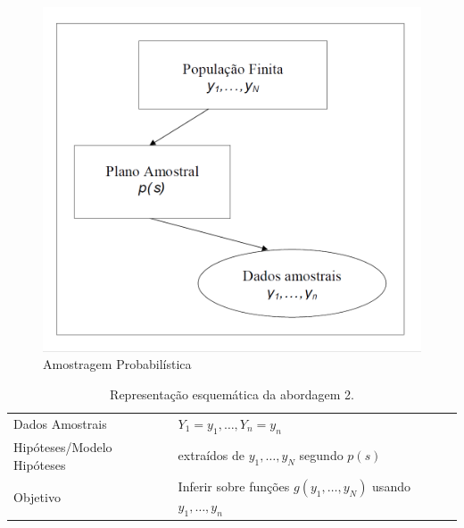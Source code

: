 \documentclass[]{book}
\theoremstyle{definition}
\theoremstyle{definition}
\theoremstyle{definition}
\theoremstyle{remark}
\begin{document}
\begin{figure}
\centering
\includegraphics{Figuras/fig22.png}
\caption{\label{fig:modamo}Amostragem Probabilística}
\end{figure}

\begin{longtable}[]{@{}ll@{}}
\caption{\label{tab:modelamo} Representação esquemática da abordagem
2.}\tabularnewline
\toprule
\begin{minipage}[t]{0.29\columnwidth}\raggedright\strut
Dados Amostrais\strut
\end{minipage} & \begin{minipage}[t]{0.60\columnwidth}\raggedright\strut
\(Y_1=y_1,\ldots, Y_n=y_n\)\strut
\end{minipage}\tabularnewline
\begin{minipage}[t]{0.29\columnwidth}\raggedright\strut
Hipóteses/Modelo Hipóteses\strut
\end{minipage} & \begin{minipage}[t]{0.60\columnwidth}\raggedright\strut
extraídos de \(y_1,\ldots,y_N\) segundo \(p(s)\)\strut
\end{minipage}\tabularnewline
\begin{minipage}[t]{0.29\columnwidth}\raggedright\strut
Objetivo\strut
\end{minipage} & \begin{minipage}[t]{0.60\columnwidth}\raggedright\strut
Inferir sobre funções \(g(y_1, \ldots, y_N)\) usando
\(y_1, \ldots,y_n\)\strut
\end{minipage}\tabularnewline
\bottomrule
\end{longtable}
\end{document}
